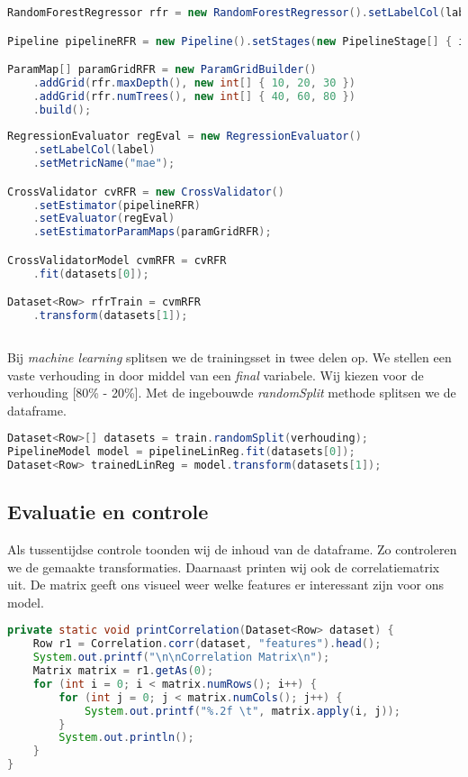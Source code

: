 \documentclass[a4paper,10pt,twoside]{report}
\begin{document}
\begin{lstlisting}[language=Java]
RandomForestRegressor rfr = new RandomForestRegressor().setLabelCol(label).setFeaturesCol("scaledFeatures");

Pipeline pipelineRFR = new Pipeline().setStages(new PipelineStage[] { indexer, assembler, stdScaler, linreg });

ParamMap[] paramGridRFR = new ParamGridBuilder()
	.addGrid(rfr.maxDepth(), new int[] { 10, 20, 30 })
	.addGrid(rfr.numTrees(), new int[] { 40, 60, 80 })
	.build();
	
RegressionEvaluator regEval = new RegressionEvaluator()
	.setLabelCol(label)
	.setMetricName("mae");

CrossValidator cvRFR = new CrossValidator()
	.setEstimator(pipelineRFR)
	.setEvaluator(regEval)
	.setEstimatorParamMaps(paramGridRFR);

CrossValidatorModel cvmRFR = cvRFR
	.fit(datasets[0]);

Dataset<Row> rfrTrain = cvmRFR
	.transform(datasets[1]);
	
\end{lstlisting}

Bij \textit{machine learning} splitsen we de trainingsset in twee delen op. We stellen een vaste verhouding in door middel van een \textit{final} variabele. Wij kiezen voor de verhouding [80\% - 20\%]. Met de ingebouwde \textit{randomSplit} methode splitsen we de dataframe. 

\begin{lstlisting}[language=Java]
Dataset<Row>[] datasets = train.randomSplit(verhouding);
PipelineModel model = pipelineLinReg.fit(datasets[0]);
Dataset<Row> trainedLinReg = model.transform(datasets[1]);
\end{lstlisting}

\newpage

\subsection*{Evaluatie en controle}

Als tussentijdse controle toonden wij de inhoud van de dataframe. Zo controleren we de gemaakte transformaties. Daarnaast printen wij ook de correlatiematrix uit. De matrix geeft ons visueel weer welke features er interessant zijn voor ons model.

\begin{lstlisting}[language=Java]
private static void printCorrelation(Dataset<Row> dataset) {
	Row r1 = Correlation.corr(dataset, "features").head();
	System.out.printf("\n\nCorrelation Matrix\n");
	Matrix matrix = r1.getAs(0);
	for (int i = 0; i < matrix.numRows(); i++) {
		for (int j = 0; j < matrix.numCols(); j++) {
			System.out.printf("%.2f \t", matrix.apply(i, j));
		}
		System.out.println();
	}
}
\end{lstlisting}
\end{document}

